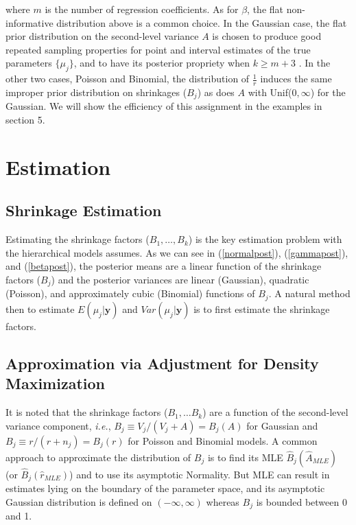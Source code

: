 \documentclass[article]{jss}
\begin{document}
where $m$ is the number of regression coefficients. As for $\beta$, the flat non-informative distribution above is a common choice. In the Gaussian case, the flat prior distribution on the second-level variance $A$ is chosen to produce good repeated sampling properties for point and interval estimates of the true parameters $\{\mu_{j}\}$, and to have its posterior propriety when $k\ge m+3$ \citep{2011}. In the other two cases, Poisson and Binomial, the distribution of $\frac{1}{r}$ induces the same improper prior distribution on shrinkages ($B_{j}$) as does $A$ with Unif($0, \infty$) for the Gaussian. We will show the efficiency of this assignment  in the examples in section 5.



\section[Estimation]{Estimation}

\subsection[Shrinkage Estimation]{Shrinkage Estimation}
Estimating the shrinkage factors ($B_1, \ldots, B_k$) is the key estimation problem with the hierarchical models  assumes. As we can see in (\ref{normalpost}), (\ref{gammapost}), and (\ref{betapost}), the posterior means are a linear function of the shrinkage factors ($B_{j}$) and the posterior variances are linear (Gaussian), quadratic (Poisson), and  approximately cubic (Binomial) functions of $B_{j}$. A natural method then to estimate $E(\mu_{j}\vert \textbf{y})$ and $Var(\mu_{j}\vert \textbf{y})$ is to first estimate the shrinkage factors.

\subsection[ADM]{Approximation via Adjustment for Density Maximization}
It is noted that the shrinkage factors ($B_1, \ldots B_k$) are a function of the second-level variance component, \emph{i.e.}, $B_{j}\equiv V_{j}/(V_{j}+A)=B_{j}(A)$ for Gaussian and $B_{j}\equiv r/(r+n_{j})=B_{j}(r)$ for Poisson and Binomial models. A common approach to approximate the distribution of $B_{j}$ is to find its MLE $\hat{B}_{j}(\hat{A}_{MLE})$ (or  $\hat{B}_{j}(\hat{r}_{MLE})$) and to use its asymptotic Normality. But MLE can result in estimates lying on the boundary of the parameter space, and its asymptotic Gaussian distribution is defined on $(-\infty, \infty)$ whereas $B_{j}$ is bounded between 0 and 1.
\end{document}
